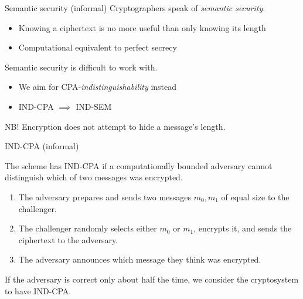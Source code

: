\begin{frame}{Semantic security (informal)}
  Cryptographers speak of \emph{semantic security}.
  \begin{itemize}[<+(1)->]
    \item Knowing a ciphertext is no more useful than only knowing its length
    \item Computational equivalent to perfect secrecy
  \end{itemize}

  \vspace*{1em}

  \pause
  Semantic security is difficult to work with.
  \begin{itemize}[<+(1)->]
    \item We aim for CPA-\emph{indistinguishability} instead
    \item IND-CPA $\implies$ IND-SEM
  \end{itemize}

  \vspace{1em}
  \pause
  NB! Encryption does not attempt to hide a message's length.
\end{frame}

\begin{frame}{IND-CPA (informal)}

  The scheme has IND-CPA if a computationally bounded adversary cannot distinguish which of two messages was encrypted.
  \begin{enumerate}[<+(1)->]
    \item The adversary prepares and sends two messages $m_0, m_1$ of equal size to the challenger.
    \item The challenger randomly selects either $m_0$ or $m_1$, encrypts it, and sends the ciphertext to the adversary.
    \item The adversary announces which message they think was encrypted.
  \end{enumerate}

  \pause
  If the adversary is correct only about half the time, we consider the cryptosystem to have IND-CPA.
\end{frame}

